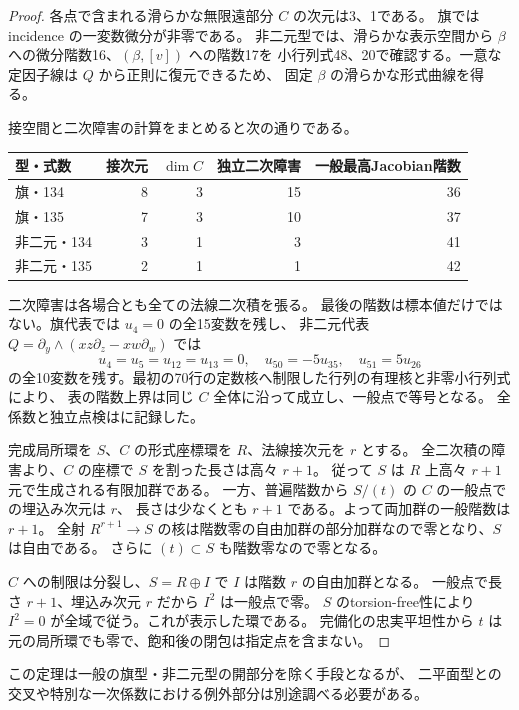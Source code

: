 \documentclass[11pt,a4paper]{ltjsarticle}
\theoremstyle{remark}
\begin{document}
\begin{proof}
各点で含まれる滑らかな無限遠部分 $C$ の次元は3、1である。
旗では incidence の一変数微分が非零である。
非二元型では、滑らかな表示空間から $\beta$ への微分階数16、$(\beta,[v])$ への階数17を
小行列式48、20で確認する。一意な定因子線は $Q$ から正則に復元できるため、
固定 $\beta$ の滑らかな形式曲線を得る。

接空間と二次障害の計算をまとめると次の通りである。
\begin{center}
\begin{tabular}{lrrrr}
\toprule
型・式数&接次元&$\dim C$&独立二次障害&一般最高Jacobian階数\\
\midrule
旗・134&8&3&15&36\\
旗・135&7&3&10&37\\
非二元・134&3&1&3&41\\
非二元・135&2&1&1&42\\
\bottomrule
\end{tabular}
\end{center}
二次障害は各場合とも全ての法線二次積を張る。
最後の階数は標本値だけではない。旗代表では $u_4=0$ の全15変数を残し、
非二元代表 $Q=\partial_y\wedge(xz\partial_z-xw\partial_w)$ では
\[
 u_4=u_5=u_{12}=u_{13}=0,\quad u_{50}=-5u_{35},\quad u_{51}=5u_{26}
\]
の全10変数を残す。最初の70行の定数核へ制限した行列の有理核と非零小行列式により、
表の階数上界は同じ $C$ 全体に沿って成立し、一般点で等号となる。
全係数と独立点検は\cite{formal-rings-v32}に記録した。

完成局所環を $S$、$C$ の形式座標環を $R$、法線接次元を $r$ とする。
全二次積の障害より、$C$ の座標で $S$ を割った長さは高々 $r+1$。
従って $S$ は $R$ 上高々 $r+1$ 元で生成される有限加群である。
一方、普遍階数から $S/(t)$ の $C$ の一般点での埋込み次元は $r$、
長さは少なくとも $r+1$ である。よって両加群の一般階数は $r+1$。
全射 $R^{r+1}\to S$ の核は階数零の自由加群の部分加群なので零となり、$S$ は自由である。
さらに $(t)\subset S$ も階数零なので零となる。

$C$ への制限は分裂し、$S=R\oplus I$ で $I$ は階数 $r$ の自由加群となる。
一般点で長さ $r+1$、埋込み次元 $r$ だから $I^2$ は一般点で零。
$S$ のtorsion-free性により $I^2=0$ が全域で従う。これが表示した環である。
完備化の忠実平坦性から $t$ は元の局所環でも零で、飽和後の閉包は指定点を含まない。
\end{proof}

この定理は一般の旗型・非二元型の開部分を除く手段となるが、
二平面型との交叉や特別な一次係数における例外部分は別途調べる必要がある。
\end{document}
